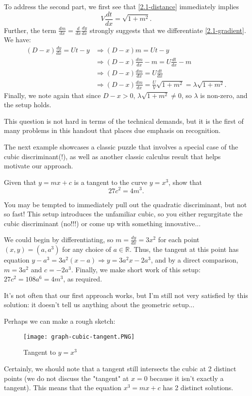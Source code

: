 \documentclass[../main.tex]{subfiles}
\begin{document}
To address the second part, we first see that \eqref{2.1-distance} immediately implies $$V\frac{dt}{dx}=\sqrt{1+m^2}.$$ Further, the term $\frac{dm}{dx}=\frac{d}{dx}\frac{dy}{dx}$ strongly suggests that we differentiate \eqref{2.1-gradient}. We have:
\begin{align*}
    (D-x)\frac{dy}{dx}=Ut-y &\Longrightarrow (D-x)m = Ut-y \\
    &\Longrightarrow (D-x)\frac{dm}{dx}-m=U\frac{dt}{dx}-m \\
    &\Longrightarrow (D-x)\frac{dm}{dx}=U\frac{dt}{dx} \\
    &\Longrightarrow (D-x)\frac{dm}{dx}=\frac{U}{V}\sqrt{1+m^2}=\lambda\sqrt{1+m^2}.
\end{align*}
Finally, we note again that since $D-x > 0$, $\lambda\sqrt{1+m^2} \neq 0$, so $\lambda$ is non-zero, and the setup holds.  

\begin{moral}
This question is not hard in terms of the technical demands, but it is the first of many problems in this handout that places due emphasis on recognition.
\end{moral}

The next example showcases a classic puzzle that involves a special case of the cubic discriminant(!), as well as another classic calculus result that helps motivate our approach.
\begin{example}
Given that $y=mx+c$ is a tangent to the curve $y=x^3$, show that 
$$27c^2=4m^3.$$
\end{example}
You may be tempted to immediately pull out the quadratic discriminant, but not so fast! This setup introduces the unfamiliar cubic, so you either regurgitate the cubic discriminant (no!!!) or come up with something innovative...

We could begin by differentiating, so $m=\frac{dy}{dx}=3x^2$ for each point $(x,y)=(a,a^3)$ for any choice of $a \in \mathbb{R}$. Thus, the tangent at this point has equation $y-a^3=3a^2(x-a) \Longrightarrow y=3a^2x-2a^3$, and by a direct comparison, $m=3a^2$ and $c=-2a^3$.
Finally, we make short work of this setup: $27c^2=108a^6=4m^3$, as required.

It's not often that our first approach works, but I'm still not very satisfied by this solution: it doesn't tell us anything about the geometric setup...

Perhaps we can make a rough sketch:
\begin{figure}[H]
    \centering
    \texttt{[image: graph-cubic-tangent.PNG]}
    \caption{Tangent to $y=x^3$}
    \label{fig:graph-cubic-tangent}
\end{figure}
Certainly, we should note that a tangent still intersects the cubic at 2 distinct points (we do not discuss the "tangent" at $x=0$ because it isn't exactly a tangent). This means that the equation $x^3=mx+c$ has 2 distinct solutions.
\end{document}
